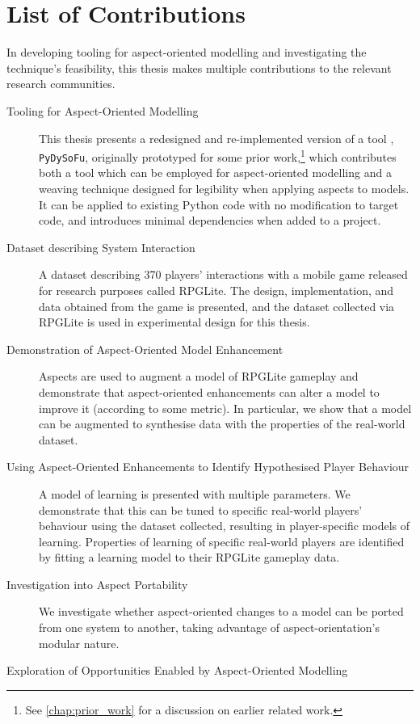 \section{List of Contributions}
\label{intro_contributions}

In developing tooling for aspect-oriented modelling and investigating the
technique's feasibility, this thesis makes multiple contributions to the
relevant research communities.

\begin{description}
  \item[Tooling for Aspect-Oriented Modelling] This thesis presents a redesigned
    and re-implemented version of a tool , \lstinline{PyDySoFu}, originally
    prototyped for some prior work,\footnote{See \cref{chap:prior_work} for a
    discussion on earlier related work.} which contributes both a tool which can
    be employed for aspect-oriented modelling and a weaving technique designed
    for legibility when applying aspects to models. It can be applied to
    existing Python code with no modification to target code, and introduces
    minimal dependencies when added to a project.
  \item[Dataset describing \SocioTechnical System Interaction] A dataset
    describing 370 players' interactions with a mobile game released for
    research purposes called RPGLite. The design, implementation, and data
    obtained from the game is presented, and the dataset collected via RPGLite
    is used in experimental design for this thesis.
  \item[Demonstration of Aspect-Oriented Model Enhancement] Aspects are used to
    augment a model of RPGLite gameplay and demonstrate that aspect-oriented
    enhancements can alter a model to improve it (according to some metric). In
    particular, we show that a model can be augmented to synthesise data with
    the properties of the real-world dataset.
  \item[Using Aspect-Oriented Enhancements to Identify Hypothesised Player
    Behaviour] A model of learning is presented with multiple parameters. We
    demonstrate that this can be tuned to specific real-world players' behaviour
    using the dataset collected, resulting in player-specific models of
    learning. Properties of learning of specific real-world players are
    identified by fitting a learning model to their RPGLite gameplay data.
  \item[Investigation into Aspect Portability] We investigate whether
    aspect-oriented changes to a model can be ported from one system to another,
    taking advantage of aspect-orientation's modular nature. 
    \item[Exploration of Opportunities Enabled by Aspect-Oriented Modelling]
\end{description}


